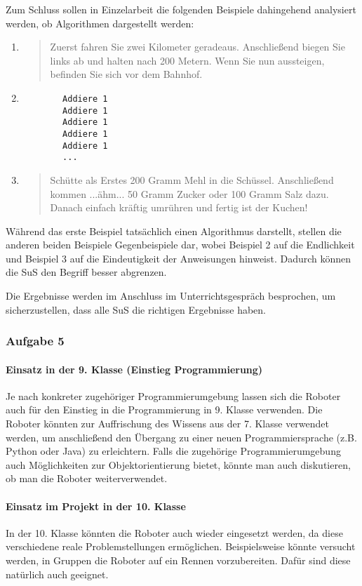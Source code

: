 Zum Schluss sollen in Einzelarbeit die folgenden Beispiele dahingehend
analysiert werden, ob Algorithmen dargestellt werden:
\begin{enumerate}
	\item
		\begin{quote}
			Zuerst fahren Sie zwei Kilometer geradeaus. Anschließend
			biegen Sie links ab und halten nach 200 Metern. Wenn Sie
			nun aussteigen, befinden Sie sich vor dem Bahnhof.
		\end{quote}
	\item
		\begin{lstlisting}
		Addiere 1
		Addiere 1
		Addiere 1
		Addiere 1
		Addiere 1
		...
		\end{lstlisting}
	\item
		\begin{quote}
			Schütte als Erstes 200 Gramm Mehl in die Schüssel.
			Anschließend kommen ...ähm... 50 Gramm Zucker oder 100
			Gramm Salz dazu. Danach einfach kräftig umrühren und
			fertig ist der Kuchen!
		\end{quote}
\end{enumerate}
Während das erste Beispiel tatsächlich einen Algorithmus darstellt, stellen die
anderen beiden Beispiele Gegenbeispiele dar, wobei Beispiel 2 auf die
Endlichkeit und Beispiel 3 auf die Eindeutigkeit der Anweisungen hinweist.
Dadurch können die SuS den Begriff besser abgrenzen.

Die Ergebnisse werden im Anschluss im Unterrichtsgespräch besprochen, um
sicherzustellen, dass alle SuS die richtigen Ergebnisse haben.

\subsubsection{Aufgabe 5}

\paragraph{Einsatz in der 9. Klasse (Einstieg Programmierung)}
Je nach konkreter zugehöriger Programmierumgebung lassen sich die Roboter auch
für den Einstieg in die Programmierung in 9. Klasse verwenden. Die Roboter
könnten zur Auffrischung des Wissens aus der 7.	Klasse verwendet werden, um
anschließend den Übergang zu einer neuen Programmiersprache (z.B. Python oder
Java) zu erleichtern. Falls die zugehörige Programmierumgebung auch
Möglichkeiten zur Objektorientierung bietet, könnte man auch diskutieren, ob man
die Roboter weiterverwendet.
\par
\paragraph{Einsatz im Projekt in der 10. Klasse}
In der 10. Klasse könnten die Roboter auch wieder eingesetzt werden, da diese
verschiedene reale Problemstellungen ermöglichen. Beispielsweise könnte versucht
werden, in Gruppen die Roboter auf ein Rennen vorzubereiten. Dafür sind diese
natürlich auch geeignet.
\par
